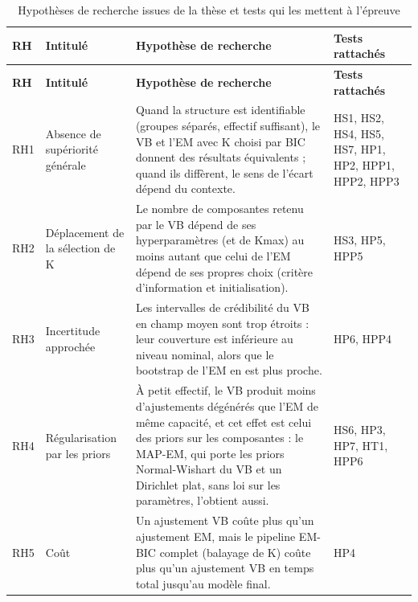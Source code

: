 {\scriptsize
\setlength{\tabcolsep}{3pt}
\begin{longtable}{>{\raggedright\arraybackslash}p{1.00cm}>{\raggedright\arraybackslash}p{3.00cm}>{\raggedright\arraybackslash}p{8.30cm}>{\raggedright\arraybackslash}p{3.00cm}}
\caption{Hypothèses de recherche issues de la thèse et tests qui les mettent à l'épreuve}\label{tab:hypotheses_recherche}\\
\toprule
\textbf{RH} & \textbf{Intitulé} & \textbf{Hypothèse de recherche} & \textbf{Tests rattachés} \\
\midrule
\endfirsthead
\toprule
\textbf{RH} & \textbf{Intitulé} & \textbf{Hypothèse de recherche} & \textbf{Tests rattachés} \\
\midrule
\endhead
\bottomrule
\endfoot
RH1 & Absence de supériorité générale & Quand la structure est identifiable (groupes séparés, effectif suffisant), le VB et l'EM avec K choisi par BIC donnent des résultats équivalents ; quand ils diffèrent, le sens de l'écart dépend du contexte. & HS1, HS2, HS4, HS5, HS7, HP1, HP2, HPP1, HPP2, HPP3 \\
RH2 & Déplacement de la sélection de K & Le nombre de composantes retenu par le VB dépend de ses hyperparamètres (et de Kmax) au moins autant que celui de l'EM dépend de ses propres choix (critère d'information et initialisation). & HS3, HP5, HPP5 \\
RH3 & Incertitude approchée & Les intervalles de crédibilité du VB en champ moyen sont trop étroits : leur couverture est inférieure au niveau nominal, alors que le bootstrap de l'EM en est plus proche. & HP6, HPP4 \\
RH4 & Régularisation par les priors & À petit effectif, le VB produit moins d'ajustements dégénérés que l'EM de même capacité, et cet effet est celui des priors sur les composantes : le MAP-EM, qui porte les priors Normal-Wishart du VB et un Dirichlet plat, sans loi sur les paramètres, l'obtient aussi. & HS6, HP3, HP7, HT1, HPP6 \\
RH5 & Coût & Un ajustement VB coûte plus qu'un ajustement EM, mais le pipeline EM-BIC complet (balayage de K) coûte plus qu'un ajustement VB en temps total jusqu'au modèle final. & HP4 \\
\end{longtable}
}
